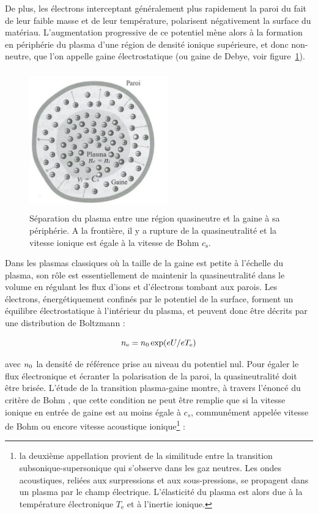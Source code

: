 \begin{refsection}
De plus, les électrons interceptant généralement
plus rapidement la paroi du fait de leur faible masse et de leur température,
polarisent négativement la surface du matériau.
L'augmentation progressive de ce potentiel mène alors à la formation en
périphérie du plasma d'une région de densité ionique supérieure, et donc
non-neutre, que l'on appelle gaine électrostatique (ou gaine de Debye, voir
figure~\ref{1-gaine1}).

\begin{figure}[htbp]
\centering
\includegraphics[height=60mm,width=60mm]{figures/1-sheath.jpg}{\caption{Séparation
du plasma entre une région quasineutre et la gaine à sa
périphérie. A la frontière, il y a rupture de la quasineutralité et la vitesse
ionique est égale à la vitesse de Bohm
$c_\text{s}$\parencite{Rax}.}\label{1-gaine1}}
\end{figure}

Dans les plasmas classiques où la taille de la gaine est petite
à l'échelle du plasma, son rôle est essentiellement de
maintenir la quasineutralité dans le volume en régulant les flux d'ions et
d'électrons tombant aux parois. Les électrons, énergétiquement confinés par le
potentiel de la surface, forment un équilibre électrostatique à l'intérieur du
plasma, et peuvent donc être décrits par une distribution de Boltzmann :

\begin{equation}
	n_\text{e}=n{_{0}}\exp(eU/eT_\text{e})
\end{equation}

avec $n{_{0}}$ la densité de référence prise au niveau du potentiel nul.
Pour égaler le flux électronique et écranter la polarisation de la paroi, la
quasineutralité doit être brisée. L'étude de la transition plasma-gaine montre,
à travers l'énoncé du critère de Bohm \parencite{Stangeby}, que
cette condition ne peut être remplie que si la vitesse ionique en entrée de
gaine est au moins égale à $c_s$, communément appelée vitesse de Bohm ou encore
vitesse acoustique ionique\footnote{la deuxième appellation provient de la similitude entre la
transition subsonique-supersonique qui s'observe dans les gaz neutres. Les
ondes acoustiques, reliées aux surpressions et aux sous-pressions, se propagent
dans un plasma par le champ électrique. L'élasticité du plasma est alors due à
la température électronique $T_\text{e}$ et à l'inertie ionique.} :


\end{refsection}
